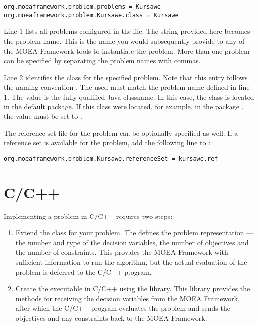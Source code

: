 \begin{lstlisting}[language=Plaintext]
org.moeaframework.problem.problems = Kursawe
org.moeaframework.problem.Kursawe.class = Kursawe
\end{lstlisting}

Line 1 lists all problems configured in the  file.  The string provided here becomes the problem name.  This is the name you would subsequently provide to any of the MOEA Framework tools to instantiate the problem.  More than one problem can be specified by separating the problem names with commas.

Line 2 identifies the class for the specified problem.  Note that this entry follows the naming convention .  The  used must match the problem name defined in line 1.  The value is the fully-qualified Java classname.  In this case, the class is located in the default package.  If this class were located, for example, in the package , the value must be set to .

The reference set file for the problem can be optionally specified as well.  If a reference set is available for the problem, add the following line to :

\begin{lstlisting}[language=Plaintext]
org.moeaframework.problem.Kursawe.referenceSet = kursawe.ref
\end{lstlisting}

\section{C/C++}
Implementing a problem in C/C++ requires two steps:
\begin{enumerate}
  \item Extend the  class for your problem.  The  defines the problem representation --- the number and type of the decision variables, the number of objectives and the number of constraints.  This provides the MOEA Framework with sufficient information to run the algorithm, but the actual evaluation of the problem is deferred to the C/C++ program.
  \item Create the executable in C/C++ using the  library.  This library provides the methods for receiving the decision variables from the MOEA Framework, after which the C/C++ program evaluates the problem and sends the objectives and any constraints back to the MOEA Framework.
\end{enumerate}

